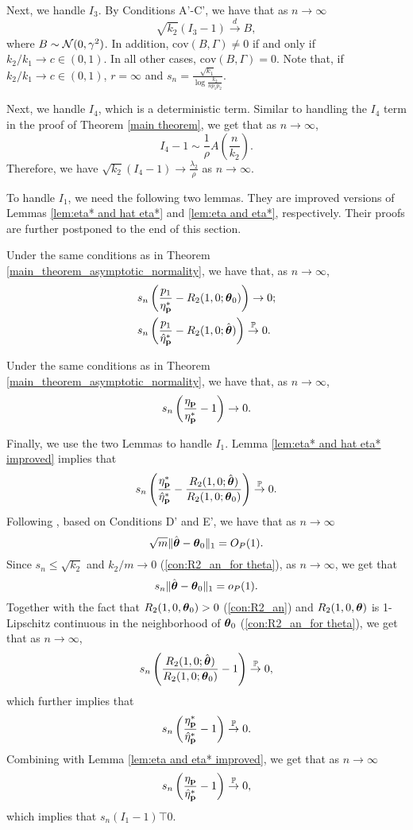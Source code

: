     Next, we handle $I_3$. By Conditions A'-C', we have that as $n\to\infty$
    $$\sqrt{k_2}\left(I_{3}-1\right)\stackrel{d}{\to} B,$$
    where $B\sim {\cal N}(0,\gamma^2)$. In addition, $\text{cov}(B,\Gamma)\neq 0$ if and only if $k_2/k_1\to c\in (0,1)$. In all other cases, $\text{cov}(B,\Gamma)=0$.  Note that, if $k_2/k_1\to c\in (0,1)$, $r=\infty$ and $s_n=\frac{\sqrt{k_1}}{\log \frac{k_2}{np_1p_2}}$.

    Next, we handle $I_4$, which is a deterministic term. Similar to handling the $I_4$ term in the proof of Theorem \ref{main theorem}, we get that as $n\to\infty$,
    $$I_4-1\sim \frac{1}{\rho}A\left(\frac{n}{k_2}\right).$$ Therefore, we have $\sqrt{k_2}(I_4-1)\to \frac{\lambda_2}{\rho}$ as $n\to\infty$.

    To handle $I_1$, we need the following two lemmas. They are improved versions of Lemmas \ref{lem:eta* and hat eta*} and \ref{lem:eta and eta*}, respectively. Their proofs are further postponed to the end of this section.
    \begin{lemma} \label{lem:eta* and hat eta* improved} Under the same conditions as in Theorem \ref{main_theorem_asymptotic_normality}, we have that, as $n\to\infty$,
        \begin{align*}
            &s_n\left(\frac{p_1}{\h_\pb^*}-R_2(1,0;\thb_0)\right)\to 0;\\
            &s_n\left(\frac{p_1}{\hat \h_\pb^*}-R_2(1,0;\hat \thb)\right)\top 0.
        \end{align*}
    \end{lemma}
    \begin{lemma} \label{lem:eta and eta* improved}
        Under the same conditions as in Theorem \ref{main_theorem_asymptotic_normality}, we have that, as $n\to\infty$,
        $$s_n\left(\frac{\eta_{\mathbf p}}{\eta_{\mathbf p}^*}-1\right)\to 0.$$
    \end{lemma}
    
    Finally, we use the two Lemmas to handle $I_1$. Lemma \ref{lem:eta* and hat eta* improved} implies that 
    $$s_n\left(\frac{\h_\pb^*}{\hat \h_\pb^*}-\frac{R_2(1,0;\hat \thb)}{R_2(1,0;\thb_0)}\right)\top 0.$$
    Following \cite{Einmahl_etal2012_sup}, based on Conditions D' and E', we have that as $n\to\infty$ 
    $$\sqrt{m}\Vert \hat{\boldsymbol{\theta}} -\boldsymbol{\theta}_0\Vert_1 =O_P(1).$$
    Since $s_n\leq \sqrt{k_2}$ and $k_2/m\to 0$ (\ref{con:R2_an_for theta}), as $n\to\infty$, we get that
    $$s_n\Vert \hat{\boldsymbol{\theta}} -\boldsymbol{\theta}_0\Vert_1 =o_P(1).$$
    Together with the fact that $R_2(1,0,\boldsymbol{\theta}_0)>0$ (\ref{con:R2_an}) and $R_2(1,0,\boldsymbol{\theta})$ is 1-Lipschitz continuous in the neighborhood of $\boldsymbol{\theta}_0$ (\ref{con:R2_an_for theta}), we get that as $n\to\infty$,
    $$s_n\left(\frac{R_2(1,0;\hat \thb)}{R_2(1,0;\thb_0)}-1\right)\top 0, $$ %
    which further implies that
    $$s_n\left(\frac{\h_\pb^*}{\hat \h_\pb^*}-1\right)\top 0.$$
    Combining with Lemma \ref{lem:eta and eta* improved}, we get that as $n\to\infty$
    $$s_n\left(\frac{\h_\pb}{\hat \h_\pb^*}-1\right)\top 0,$$
    which implies that $s_n(I_1-1)\top 0$.

